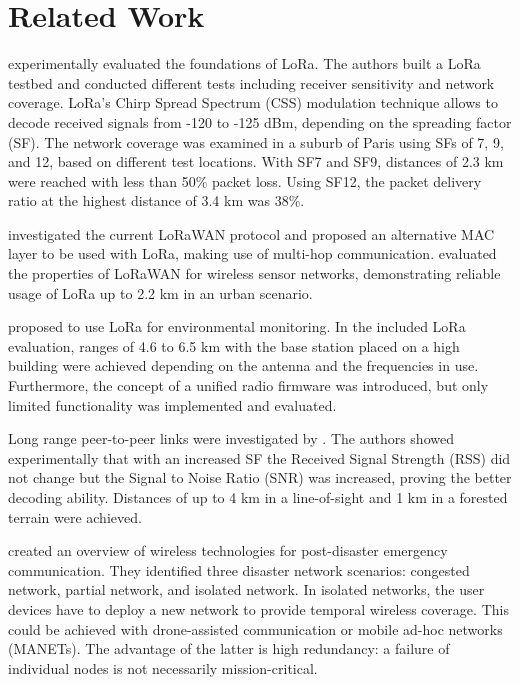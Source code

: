 \section{Related Work}
\label{sec:relwork}

\cite{augustin2016study} experimentally evaluated the foundations of LoRa. 
The authors built a LoRa testbed and conducted different tests including receiver sensitivity and network coverage.
LoRa's Chirp Spread Spectrum (CSS) modulation technique allows to decode received signals from -120 to -125 dBm, depending on the spreading factor (SF). 
The network coverage was examined in a suburb of Paris using SFs of 7, 9, and 12, based on different test locations.
With SF7 and SF9, distances of 2.3 km were reached with less than 50\% packet loss. Using SF12, the packet delivery ratio at the highest distance of 3.4 km was 38\%.

\cite{bor2016lora} investigated the current LoRaWAN protocol and proposed an alternative MAC layer to be used with LoRa, making use of multi-hop communication. 
\cite{wixted2016evaluation} evaluated the properties of LoRaWAN for wireless sensor networks, demonstrating reliable usage of LoRa up to 2.2 km in an urban scenario.

\cite{baumgartner2018environmental} proposed to use LoRa for environmental monitoring.
In the included LoRa evaluation, ranges of 4.6 to 6.5 km with the base station placed on a high building were achieved depending on the antenna and the frequencies in use.
Furthermore, the concept of a unified radio firmware was introduced, but only limited functionality was implemented and evaluated.

Long range peer-to-peer links were investigated by \cite{callebaut2019lora}. 
The authors showed experimentally that with an increased SF the Received Signal Strength (RSS) did not change but the Signal to Noise Ratio (SNR) was increased, proving the better decoding ability.
Distances of up to 4 km in a line-of-sight and 1 km in a forested terrain were achieved.


\cite{deepak2019OverviewPostDisasterEC} created an overview of wireless technologies for post-disaster emergency communication.
They identified three disaster network scenarios: congested network, partial network, and isolated network.
In isolated networks, the user devices have to deploy a new network to provide temporal wireless coverage.
This could be achieved with drone-assisted communication or mobile ad-hoc networks (MANETs).
The advantage of the latter is high redundancy: a failure of individual nodes is not necessarily mission-critical.


